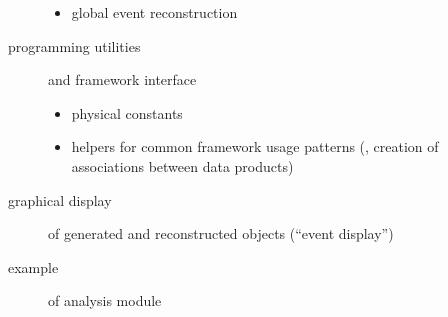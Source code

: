 \begin{description}
\begin{itemize}
         \item global event reconstruction
      \end{itemize}
   \item[programming utilities] and framework interface
      \begin{itemize}
         \item physical constants
         \item helpers for common framework usage patterns (\eg, creation of associations between data products)
      \end{itemize}
   \item[graphical display] of generated and reconstructed objects (``event display'')
   \item[example] of analysis module
\end{description}

